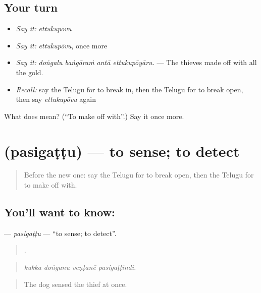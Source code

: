 \subsection*{Your turn}
\begin{itemize}
\raggedright
  \item \emph{Say it:} \emph{ettukupōvu}
  \item \emph{Say it:} \emph{ettukupōvu}, once more
  \item \emph{Say it:} \emph{doṅgalu baṅgāraṁ antā ettukupōyāru.} — The thieves made off with all the gold.
  \item \emph{Recall:} say the Telugu for to break in, then the Telugu for to break open, then say \emph{ettukupōvu} again
\end{itemize}

\begin{tcolorbox}[breakable,colback=teal!4,colframe=teal!35!black,title={Before you move on}]
What does  mean? (\textquotedblleft{}To make off with\textquotedblright{}.) Say it once more.
\end{tcolorbox}
\section[\texorpdfstring{\te{పసిగట్టు} (pasigaṭṭu)}{పసిగట్టు (pasigaṭṭu)}]{ (pasigaṭṭu) — to sense; to detect}

\label{lesson:TE-C329-pasigattu}



\begin{quote}
Before the new one: say the Telugu for to break open, then the Telugu for to make off with.
\end{quote}

\subsection*{You'll want to know: }
\textbf{} — \emph{pasigaṭṭu} — \textquotedblleft{}to sense; to detect\textquotedblright{}.

\begin{quote}
   .
\end{quote}

\begin{quote}
\emph{kukka doṅganu veṇṭanē pasigaṭṭindi.}
\end{quote}

\begin{quote}
The dog sensed the thief at once.
\end{quote}

